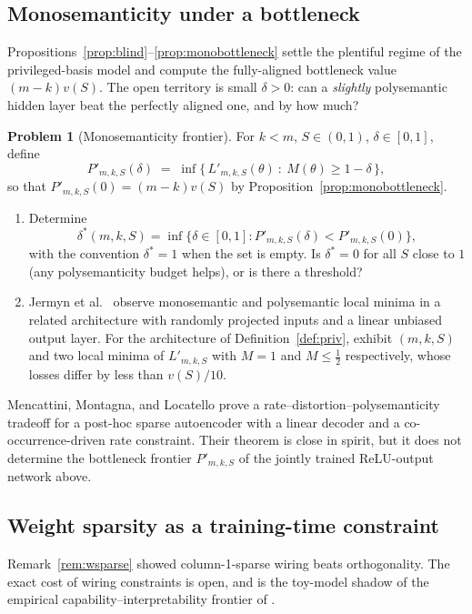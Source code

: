 \documentclass[11pt]{amsart}
\theoremstyle{plain}
\theoremstyle{definition}
\newtheorem{problem}[theorem]{Problem}
\begin{document}
\subsection{Monosemanticity under a bottleneck}

Propositions~\ref{prop:blind}--\ref{prop:monobottleneck} settle the plentiful regime of the privileged-basis model and compute the fully-aligned bottleneck value $(m-k)v(S)$. The open territory is small $\delta>0$: can a \emph{slightly} polysemantic hidden layer beat the perfectly aligned one, and by how much?

\begin{problem}[Monosemanticity frontier]\label{prob:mono}
For $k<m$, $S\in(0,1)$, $\delta\in[0,1]$, define
\[
P'_{m,k,S}(\delta) \;=\; \inf\bigl\{\,L'_{m,k,S}(\theta)\ :\ M(\theta)\ge 1-\delta\,\bigr\},
\]
so that $P'_{m,k,S}(0)=(m-k)v(S)$ by Proposition~\ref{prop:monobottleneck}.
\begin{enumerate}
\item Determine
\[
\delta^*(m,k,S)=\inf\{\delta\in[0,1] : P'_{m,k,S}(\delta)<P'_{m,k,S}(0)\},
\]
with the convention $\delta^*=1$ when the set is empty. Is $\delta^*=0$ for all $S$ close to $1$ (any polysemanticity budget helps), or is there a threshold?
\item Jermyn et al.~\cite{jermyn2022} observe monosemantic and polysemantic local minima in a related architecture with randomly projected inputs and a linear unbiased output layer. For the architecture of Definition~\ref{def:priv}, exhibit $(m,k,S)$ and two local minima of $L'_{m,k,S}$ with $M=1$ and $M\le\tfrac12$ respectively, whose losses differ by less than $v(S)/10$.
\end{enumerate}
\end{problem}

Mencattini, Montagna, and Locatello \cite{mencattini2026} prove a rate--distortion--polysemanticity tradeoff for a post-hoc sparse autoencoder with a linear decoder and a co-occurrence-driven rate constraint. Their theorem is close in spirit, but it does not determine the bottleneck frontier $P'_{m,k,S}$ of the jointly trained ReLU-output network above.

\subsection{Weight sparsity as a training-time constraint}

Remark~\ref{rem:wsparse} showed column-1-sparse wiring beats orthogonality. The exact cost of wiring constraints is open, and is the toy-model shadow of the empirical capability--interpretability frontier of \cite{gao2025}.
\end{document}
